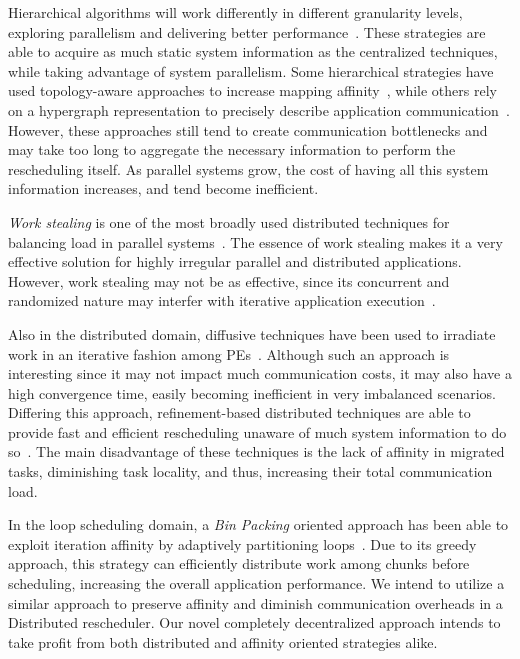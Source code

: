 Hierarchical algorithms will work differently in different granularity levels, exploring parallelism and delivering better performance~\cite{hybrid,nuco}.
These strategies are able to acquire as much static system information as the centralized techniques, while taking advantage of system parallelism.
Some hierarchical strategies have used topology-aware approaches to increase mapping affinity~\cite{nuco,hwtopo}, while others rely on a hypergraph representation to precisely describe application communication~\cite{ZoltanParHypRepart07}.
However, these approaches still tend to create communication bottlenecks and may take too long to aggregate the necessary information to perform the rescheduling itself.
As parallel systems grow, the cost of having all this system information increases, and tend become inefficient.

\textit{Work stealing} is one of the most broadly used distributed techniques for balancing load in parallel systems~\cite{DBLP:journals/ijpp/YangH18,Janjic2013}.
The essence of work stealing makes it a very effective solution for highly irregular parallel and distributed applications.
However, work stealing may not be as effective, since its concurrent and randomized nature may interfer with iterative application execution~\cite{lifflander2012work}.

Also in the distributed domain, diffusive techniques have been used to irradiate work in an iterative fashion among PEs~\cite{diffus}.
Although such an approach is interesting since it may not impact much communication costs, it may also have a high convergence time, easily becoming inefficient in very imbalanced scenarios.
Differing this approach, refinement-based distributed techniques are able to provide fast and efficient rescheduling unaware of much system information to do so~\cite{grapevine}.
The main disadvantage of these techniques is the lack of affinity in migrated tasks, diminishing task locality, and thus, increasing their total communication load.

In the loop scheduling domain, a \textit{Bin Packing} oriented approach has been able to exploit iteration affinity by adaptively partitioning loops~\cite{Castro-Penna-WSCAD:2017}.
Due to its greedy approach, this strategy can efficiently distribute work among chunks before scheduling, increasing the overall application performance.
We intend to utilize a similar approach to preserve affinity and diminish communication overheads in a Distributed rescheduler.
Our novel completely decentralized approach intends to take profit from both distributed and affinity oriented strategies alike.

